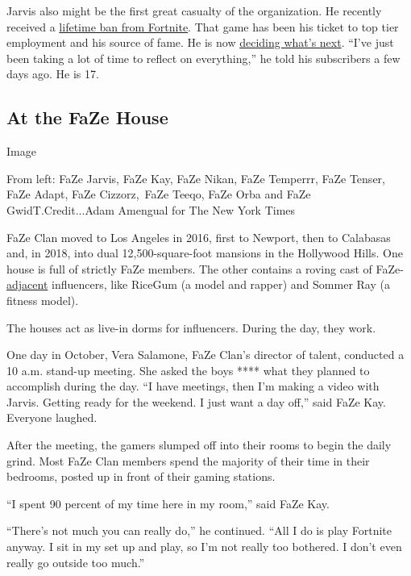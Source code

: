 Jarvis also might be the first great casualty of the organization. He
recently received a
\href{https://www.dexerto.com/fortnite/faze-clan-pro-jarvis-permanently-banned-on-fortnite-1211480}{lifetime
ban from Fortnite}. That game has been his ticket to top tier employment
and his source of fame. He is now
\href{https://www.youtube.com/watch?v=VeRCfqD28_U\&feature=emb_title}{deciding
what's next}. ``I've just been taking a lot of time to reflect on
everything,'' he told his subscribers a few days ago. He is 17.

\hypertarget{at-the-faze-house}{%
\subsection{At the FaZe House}\label{at-the-faze-house}}

Image

From left: FaZe Jarvis, FaZe Kay, FaZe Nikan, FaZe Temperrr, FaZe
Tenser, FaZe Adapt, FaZe Cizzorz,~FaZe Teeqo, FaZe Orba and FaZe
GwidT.Credit...Adam Amengual for The New York Times

FaZe Clan moved to Los Angeles in 2016, first to Newport, then to
Calabasas and, in 2018, into dual 12,500-square-foot mansions in the
Hollywood Hills. One house is full of strictly FaZe members. The other
contains a roving cast of
FaZe-\href{https://www.nytimes3xbfgragh.onion/2019/07/16/style/are-you-adjacent.html}{adjacent}
influencers, like RiceGum (a model and rapper) and Sommer Ray (a fitness
model).

The houses act as live-in dorms for influencers. During the day, they
work.

One day in October, Vera Salamone, FaZe Clan's director of talent,
conducted a 10 a.m. stand-up meeting. She asked the boys **** what they
planned to accomplish during the day. ``I have meetings, then I'm making
a video with Jarvis. Getting ready for the weekend. I just want a day
off,'' said FaZe Kay. Everyone laughed.

After the meeting, the gamers slumped off into their rooms to begin the
daily grind. Most FaZe Clan members spend the majority of their time in
their bedrooms, posted up in front of their gaming stations.

``I spent 90 percent of my time here in my room,'' said FaZe Kay.

``There's not much you can really do,'' he continued. ``All I do is play
Fortnite anyway. I sit in my set up and play, so I'm not really too
bothered. I don't even really go outside too much.''

